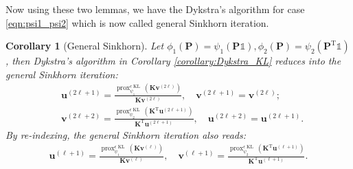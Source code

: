 \documentclass[11pt]{book}
\newtheorem{corollary}[theorem]{Corollary}
\begin{document}
Now using these two lemmas, we have the Dykstra's algorithm for case \eqref{eqn:psi1_psi2} which is now called general Sinkhorn iteration.
\begin{corollary}[General Sinkhorn]
    Let $\phi_1(\mathbf{P}) = \psi_1(\mathbf{P}\mathbb{1}),
    \phi_2(\mathbf{P}) = \psi_2(\mathbf{P}^{\mathrm{T}}\mathbb{1})$, then Dykstra's algorithm in Corollary \ref{corollary:Dykstra_KL} reduces into the general Sinkhorn iteration:
    \begin{align*}
        &\mathbf{u}^{(2\ell+1)} = \frac{ \operatorname{prox}_{\psi_1}^{\epsilon\operatorname{KL}}(\mathbf{K}\mathbf{v}^{(2\ell)}) }{\mathbf{K}\mathbf{v}^{(2\ell)}}, \quad  \mathbf{v}^{(2\ell+1)} =  \mathbf{v}^{(2\ell)}; \\
        &\mathbf{v}^{(2\ell+2)} = \frac{ \operatorname{prox}_{\psi_2}^{\epsilon\operatorname{KL}}(\mathbf{K}^{\mathrm{T}}\mathbf{u}^{(2\ell+1)}) }{\mathbf{K}^{\mathrm{T}}\mathbf{u}^{(2\ell+1)}}, \quad  \mathbf{u}^{(2\ell+2)} =  \mathbf{u}^{(2\ell+1)}.
    \end{align*}
    By re-indexing, the general Sinkhorn iteration also reads:
\begin{align}\label{eqn:generalSinkhorn}
    \mathbf{u}^{(\ell+1)} = \frac{ \operatorname{prox}_{\psi_1}^{\epsilon\operatorname{KL}}(\mathbf{K}\mathbf{v}^{(\ell)}) }{\mathbf{K}\mathbf{v}^{(\ell)}}, \quad
    \mathbf{v}^{(\ell+1)} = \frac{ \operatorname{prox}_{\psi_2}^{\epsilon\operatorname{KL}}(\mathbf{K}^{\mathrm{T}}\mathbf{u}^{(\ell+1)}) }{\mathbf{K}^{\mathrm{T}}\mathbf{u}^{(\ell+1)}}.
\end{align}

\end{corollary}
\end{document}
